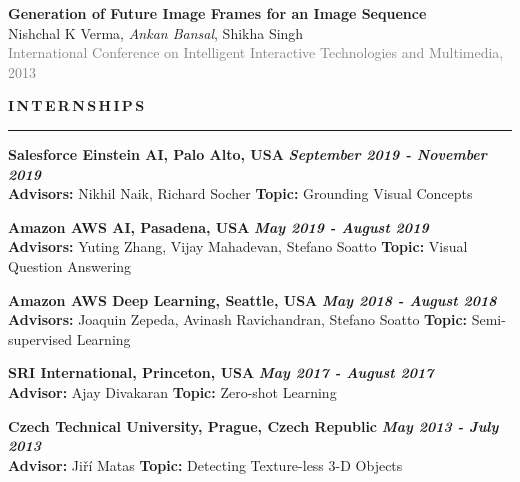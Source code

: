 \documentclass[11pt, a4paper]{article}
\begin{document}
\vspace{4pt}

\textbf{Generation of Future Image Frames for an Image Sequence} \\
Nishchal K Verma, \textit{Ankan Bansal}, Shikha Singh\\
\textcolor{gray}{International Conference on Intelligent Interactive Technologies and Multimedia, 2013}


\vspace{10pt}


\textbf{I\,N\,T\,E\,R\,N\,S\,H\,I\,P\,S}
\vspace{5pt}
\hrule
\vspace{8pt}

\textbf{Salesforce Einstein AI, Palo Alto, USA} \hfill \textit{\textbf{September 2019 - November 2019}} \\
\textbf{Advisors: }Nikhil Naik, Richard Socher \hfill \textbf{Topic: }Grounding Visual Concepts

\vspace{4pt}

\textbf{Amazon AWS AI, Pasadena, USA} \hfill \textit{\textbf{May 2019 - August 2019}} \\
\textbf{Advisors: }Yuting Zhang, Vijay Mahadevan, Stefano Soatto \hfill \textbf{Topic: }Visual Question Answering

\vspace{4pt}

\textbf{Amazon AWS Deep Learning, Seattle, USA} \hfill \textit{\textbf{May 2018 - August 2018}} \\
\textbf{Advisors: }Joaquin Zepeda, Avinash Ravichandran, Stefano Soatto \hfill \textbf{Topic: }Semi-supervised Learning

\vspace{4pt}

\textbf{SRI International, Princeton, USA} \hfill \textit{\textbf{May 2017 - August 2017}} \\
\textbf{Advisor: }Ajay Divakaran \hfill \textbf{Topic: }Zero-shot Learning

\vspace{4pt}

\textbf{Czech Technical University, Prague, Czech Republic} \hfill \textit{\textbf{May 2013 - July 2013}} \\
\textbf{Advisor: }Ji\v{r}\'{i} Matas \hfill \textbf{Topic: }Detecting Texture-less 3-D Objects
\end{document}

